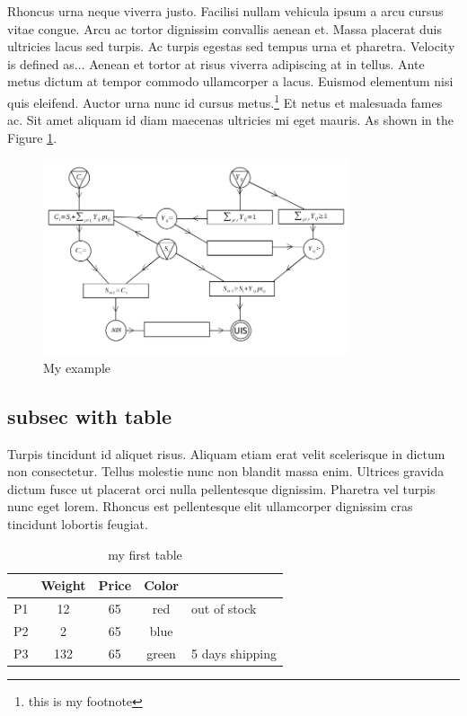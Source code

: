 \documentclass[]{article}
\begin{document}
Rhoncus urna neque viverra justo. Facilisi nullam vehicula ipsum a arcu cursus vitae congue. Arcu ac tortor dignissim convallis aenean et. Massa placerat duis ultricies lacus sed turpis. Ac turpis egestas sed tempus urna et pharetra. Velocity is defined as... \label{def_velocity} Aenean et tortor at risus viverra adipiscing at in tellus. Ante metus dictum at tempor commodo ullamcorper a lacus. Euismod elementum nisi quis eleifend. Auctor urna nunc id cursus metus.\footnote{this is my footnote} Et netus et malesuada fames ac. Sit amet aliquam id diam maecenas ultricies mi eget mauris.
As shown in the Figure \ref{fig_example1}.

\begin{figure}[htpb]
    \begin{center}
        \includegraphics[width=0.8\textwidth]{example1.png}   
    \end{center}
    \caption{My example}
    \label{fig_example1}
\end{figure}

\subsection{subsec with table}
Turpis tincidunt id aliquet risus. Aliquam etiam erat velit scelerisque in dictum non consectetur. Tellus molestie nunc non blandit massa enim. Ultrices gravida dictum fusce ut placerat orci nulla pellentesque dignissim. Pharetra vel turpis nunc eget lorem. Rhoncus est pellentesque elit ullamcorper dignissim cras tincidunt lobortis feugiat.

\begin{table}
    \caption{my first table}
    \label{tab_mytable}
    \centering
    \begin{tabular}{r|ccc|l}
            & Weight & Price & Color \\
        \hline \hline
        P1  & 12     & 65    & red   & out of stock \\
        P2  & 2      & 65    & blue  &  \\
        P3  & 132    & 65    & green & 5 days shipping\\
    \end{tabular}
\end{table}
\end{document}
